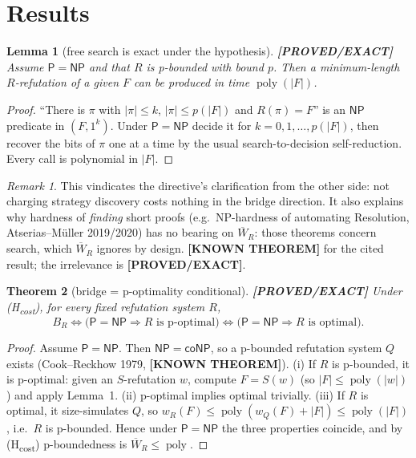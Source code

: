\documentclass[11pt]{article}
\newtheorem{theorem}{Theorem}
\newtheorem{lemma}[theorem]{Lemma}
\theoremstyle{remark}
\newtheorem*{remark}{Remark}
\newcommand{\poly}{\operatorname{poly}}
\newcommand{\Wbar}{\overline W}
\newcommand{\status}[1]{\textbf{[#1]}}
\begin{document}
\section{Results}

\begin{lemma}[free search is exact under the hypothesis]\status{PROVED/EXACT}
Assume $\mathsf P=\mathsf{NP}$ and that $R$ is p-bounded with bound $p$. Then a
minimum-length $R$-refutation of a given $F$ can be produced in time
$\poly(|F|)$.
\end{lemma}
\begin{proof}
``There is $\pi$ with $|\pi|\le k$, $|\pi|\le p(|F|)$ and $R(\pi)=F$'' is an
$\mathsf{NP}$ predicate in $(F,1^k)$. Under $\mathsf P=\mathsf{NP}$ decide it for
$k=0,1,\dots,p(|F|)$, then recover the bits of $\pi$ one at a time by the
usual search-to-decision self-reduction. Every call is polynomial in $|F|$.
\end{proof}
\begin{remark}
This vindicates the directive's clarification from the other side: not
charging strategy discovery costs nothing in the bridge direction. It also
explains why hardness of \emph{finding} short proofs (e.g.\ NP-hardness of
automating Resolution, Atserias--M\"uller 2019/2020) has no bearing on
$\Wbar_R$: those theorems concern search, which $\Wbar_R$ ignores by design.
\status{KNOWN THEOREM} for the cited result; the irrelevance is
\status{PROVED/EXACT}.
\end{remark}

\begin{theorem}[bridge = p-optimality conditional]\status{PROVED/EXACT}
Under (H\textsubscript{cost}), for every fixed refutation system $R$,
\[
 B_R\iff\bigl(\mathsf P=\mathsf{NP}\Rightarrow R\text{ is p-optimal}\bigr)
 \iff\bigl(\mathsf P=\mathsf{NP}\Rightarrow R\text{ is optimal}\bigr).
\]
\end{theorem}
\begin{proof}
Assume $\mathsf P=\mathsf{NP}$. Then $\mathsf{NP}=\mathsf{coNP}$, so a p-bounded
refutation system $Q$ exists (Cook--Reckhow 1979, \status{KNOWN THEOREM}).
(i) If $R$ is p-bounded, it is p-optimal: given an $S$-refutation $w$, compute
$F=S(w)$ (so $|F|\le\poly(|w|)$) and apply Lemma~1. (ii) p-optimal implies
optimal trivially. (iii) If $R$ is optimal, it size-simulates $Q$, so
$w_R(F)\le\poly(w_Q(F)+|F|)\le\poly(|F|)$, i.e.\ $R$ is p-bounded.
Hence under $\mathsf P=\mathsf{NP}$ the three properties coincide, and by
(H\textsubscript{cost}) p-boundedness is $\Wbar_R\le\poly$.
\end{proof}
\end{document}
